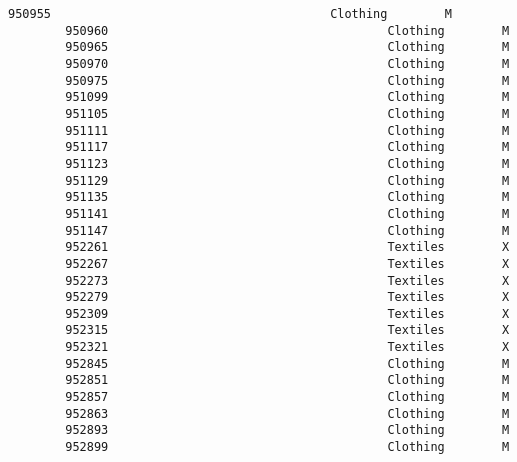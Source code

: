 \documentclass[11pt]{article}
\begin{document}
\begin{Verbatim}[commandchars=\\\{\}]
        950955                                       Clothing        M    
        950960                                       Clothing        M    
        950965                                       Clothing        M    
        950970                                       Clothing        M    
        950975                                       Clothing        M    
        951099                                       Clothing        M    
        951105                                       Clothing        M    
        951111                                       Clothing        M    
        951117                                       Clothing        M    
        951123                                       Clothing        M    
        951129                                       Clothing        M    
        951135                                       Clothing        M    
        951141                                       Clothing        M    
        951147                                       Clothing        M    
        952261                                       Textiles        X    
        952267                                       Textiles        X    
        952273                                       Textiles        X    
        952279                                       Textiles        X    
        952309                                       Textiles        X    
        952315                                       Textiles        X    
        952321                                       Textiles        X    
        952845                                       Clothing        M    
        952851                                       Clothing        M    
        952857                                       Clothing        M    
        952863                                       Clothing        M    
        952893                                       Clothing        M    
        952899                                       Clothing        M    
        

\end{Verbatim}
\end{document}
